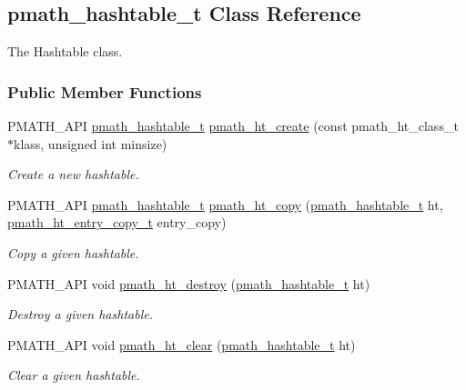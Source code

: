 \hypertarget{classpmath__hashtable__t}{
\subsection{pmath\_\-hashtable\_\-t Class Reference}
\label{classpmath__hashtable__t}
}
The Hashtable class.  


\subsubsection*{Public Member Functions}
\begin{CompactItemize}
\item 
PMATH\_\-API \hyperlink{classpmath__hashtable__t}{pmath\_\-hashtable\_\-t} \hyperlink{group__hashtables_g6835e6b0d0b308ef15f4f885298078f5}{pmath\_\-ht\_\-create} (const pmath\_\-ht\_\-class\_\-t $\ast$klass, unsigned int minsize)
\begin{CompactList}\small\item\em Create a new hashtable. \item\end{CompactList}\item 
PMATH\_\-API \hyperlink{classpmath__hashtable__t}{pmath\_\-hashtable\_\-t} \hyperlink{group__hashtables_gf82265c2aff9bb75eb7beb057a812aa3}{pmath\_\-ht\_\-copy} (\hyperlink{classpmath__hashtable__t}{pmath\_\-hashtable\_\-t} ht, \hyperlink{group__hashtables_g7afcd0897350cdf6ea146196421d70f1}{pmath\_\-ht\_\-entry\_\-copy\_\-t} entry\_\-copy)
\begin{CompactList}\small\item\em Copy a given hashtable. \item\end{CompactList}\item 
PMATH\_\-API void \hyperlink{group__hashtables_g48cbf069ed0fa62b2e95ec196aceff16}{pmath\_\-ht\_\-destroy} (\hyperlink{classpmath__hashtable__t}{pmath\_\-hashtable\_\-t} ht)
\begin{CompactList}\small\item\em Destroy a given hashtable. \item\end{CompactList}\item 
PMATH\_\-API void \hyperlink{group__hashtables_gba9a2535237d8482482a338bafa2d5f1}{pmath\_\-ht\_\-clear} (\hyperlink{classpmath__hashtable__t}{pmath\_\-hashtable\_\-t} ht)
\begin{CompactList}\small\item\em Clear a given hashtable. \item\end{CompactList}\item 

\end{CompactItemize}

